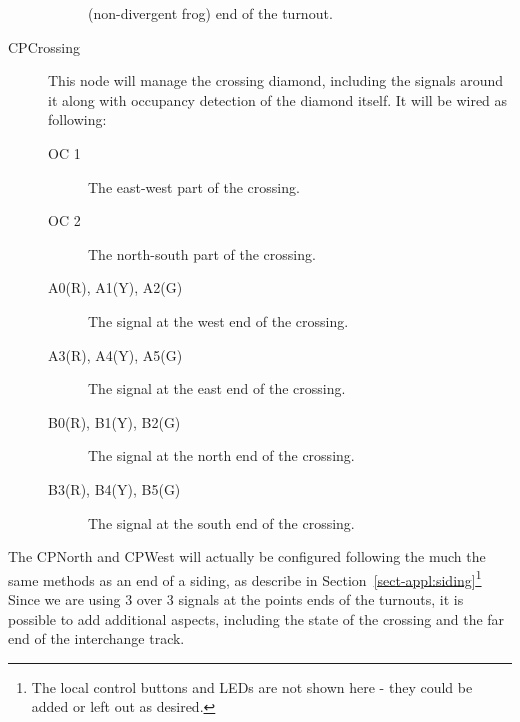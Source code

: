 \begin{description}
\begin{description}
(non-divergent frog) end of the turnout.
\end{description} 
\item [CPCrossing] This node will manage the crossing diamond, including the 
signals around it along with occupancy detection of the diamond itself.  It 
will be wired as following: 
\begin{description}
\item [OC 1] The east-west part of the crossing.
\item [OC 2] The north-south part of the crossing.
\item [A0(R), A1(Y), A2(G)] The signal at the west end of the crossing.
\item [A3(R), A4(Y), A5(G)] The signal at the east end of the crossing.
\item [B0(R), B1(Y), B2(G)] The signal at the north end of the crossing.
\item [B3(R), B4(Y), B5(G)] The signal at the south end of the crossing.
\end{description}
\end{description}

The CPNorth and CPWest will actually be configured following the much the same 
methods as an end of a siding, as describe in 
Section~\ref{sect-appl:siding}\footnote{The local control buttons and LEDs are
not shown here - they could be added or left out as desired.} Since we are 
using 3 over 3 signals at the points ends of the turnouts, it is possible to 
add additional aspects, including the state of the crossing and the far end of 
the interchange track. 
